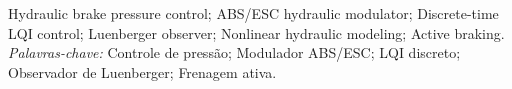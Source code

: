\documentclass[a4paper]{ifacconf}
\begin{document}
\begin{frontmatter}


      \begin{keyword}
         Hydraulic brake pressure control; ABS/ESC hydraulic modulator; Discrete-time LQI control; Luenberger observer; Nonlinear hydraulic modeling; Active braking.
         \vskip 1mm%
         {\noindent\it Palavras-chave:}
         Controle de pressão; Modulador ABS/ESC; LQI discreto; Observador de Luenberger; Frenagem ativa.
      \end{keyword}




   \end{frontmatter}
\else
\end{document}
